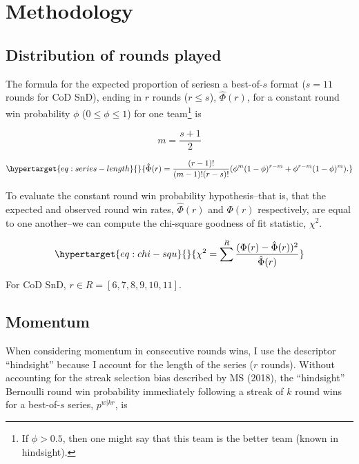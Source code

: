 \documentclass{article}
\begin{document}
\hypertarget{methodology}{%
\section{Methodology}\label{methodology}}

\hypertarget{sec:method-rounds-played}{%
\subsection{Distribution of rounds
played}\label{sec:method-rounds-played}}

The formula for the expected proportion of seriesn a best-of-\(s\)
format (\(s = 11\) rounds for CoD SnD), ending in \(r\) rounds
(\(r \leq s\)), \(\hat{\Phi}(r)\), for a constant round win probability
\(\phi\) (\(0 \leq \phi \leq 1\)) for one team\footnote{If
  \(\phi > 0.5\), then one might say that this team is the better team
  (known in hindsight).} is

\[
m = \frac{s + 1}{2}
\]

\begin{equation}\protect\hypertarget{eq:series-length}{}{
\hat{\Phi}(r) = \frac{(r - 1)!}{(m - 1)!(r - s)!}(\phi^{m}(1 - \phi)^{r - m} + \phi^{r - m}(1 - \phi)^m).
}\label{eq:series-length}\end{equation}

To evaluate the constant round win probability hypothesis--that is, that
the expected and observed round win rates, \(\hat{\Phi}(r)\) and
\(\Phi(r)\) respectively, are equal to one another--we can compute the
chi-square goodness of fit statistic, \(\chi^2\).

\begin{equation}\protect\hypertarget{eq:chi-squ}{}{
\chi^2 = \sum^R \frac{(\Phi(r) - \hat{\Phi}(r))^2}{\hat{\Phi}(r)}
}\label{eq:chi-squ}\end{equation}

For CoD SnD, \(r \in R = [6, 7, 8, 9, 10, 11]\).

\hypertarget{sec:method-momentum}{%
\subsection{Momentum}\label{sec:method-momentum}}

When considering momentum in consecutive rounds wins, I use the
descriptor ``hindsight'' because I account for the length of the series
(\(r\) rounds). Without accounting for the streak selection bias
described by MS (2018), the ``hindsight'' Bernoulli round win
probability immediately following a streak of \(k\) round wins for a
best-of-\(s\) series, \(p^{w|kr}\), is
\end{document}
